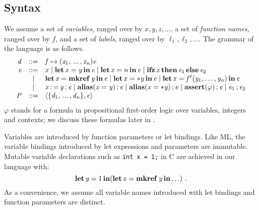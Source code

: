\subsection{Syntax}
\label{sec:language}
We assume a set of \emph{variables}, ranged over by $x,y,z,\dots$,
a set of \emph{function names}, ranged over by $f$, and
a set of \emph{labels}, ranged over by $\ell_{{\mathrm{1}}}, \ell_{{\mathrm{2}}}, \dots$.
The grammar of the language is as follows.
\[
  \begin{array}{rcl}
  \ottnt{d} &::=& \mathit{f}  \mapsto  \ottsym{(}  \mathit{x_{{\mathrm{1}}}}  \ottsym{,} \, ... \, \ottsym{,}  \mathit{x_{\ottmv{n}}}  \ottsym{)}  \ottnt{e} \\
  \ottnt{e} &::= &
               \mathit{x} \mid
                \LET  \mathit{x}  =  \mathit{y}  \IN  \ottnt{e}  \mid
                \LET  \mathit{x}  =  n  \IN  \ottnt{e}  \mid
                \IFZERO  \mathit{x}  \THEN  \ottnt{e_{{\mathrm{1}}}}  \ELSE  \ottnt{e_{{\mathrm{2}}}}  \\
        &\mid&  \LET  \mathit{x}  =   \MKREF  \mathit{y}   \IN  \ottnt{e}  \mid
                \LET  \mathit{x}  =   *  \mathit{y}   \IN  \ottnt{e}  \mid
                \LET  \mathit{x}  =   \mathit{f} ^ \ell (  \mathit{y_{{\mathrm{1}}}} ,\ldots, \mathit{y_{\ottmv{n}}}  )   \IN  \ottnt{e}  \\
        &\mid&  \mathit{x}  \WRITE  \mathit{y}  \SEQ  \ottnt{e}  \mid
                \ALIAS( \mathit{x}  =  \mathit{y} ) \SEQ  \ottnt{e}  \mid
                \ALIAS( \mathit{x}  = *  \mathit{y} ) \SEQ  \ottnt{e}  \mid
                \ASSERT( \varphi ) \SEQ  \ottnt{e}  \mid
                \ottnt{e_{{\mathrm{1}}}}  \SEQ  \ottnt{e_{{\mathrm{2}}}}  \\
    \ottnt{P} &::=&  \tuple{ \ottsym{\{}  \ottnt{d_{{\mathrm{1}}}}  \ottsym{,} \, ... \, \ottsym{,}  \ottnt{d_{\ottmv{n}}}  \ottsym{\}} ,  \ottnt{e} }  %
  \end{array}
\]
$\varphi$ stands for a formula in propositional first-order
logic over variables, integers and contexts;
we discuss these formulas later in .

Variables are introduced by function parameters or let bindings.
Like ML, the variable bindings introduced by let expressions and parameters
are immutable.
Mutable variable declarations such as \texttt{int x = 1;} in C are achieved in our language with:
\[
   \operatorname{\mathbf{let}}  \mathit{y}  =  1  \operatorname{\mathbf{in}}  (   \operatorname{\mathbf{let}}  \mathit{x}  =   \operatorname{\mathbf{mkref}}  \mathit{y}   \operatorname{\mathbf{in}}   \ldots    ) \ .
\]
As a convenience, we assume all variable names
introduced with let bindings and function parameters are distinct.

